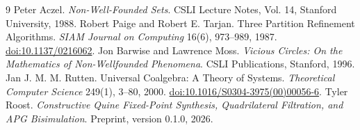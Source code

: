 \documentclass[11pt]{article}
\theoremstyle{definition}
\begin{document}
\begin{thebibliography}{9}
\small
{} Peter Aczel. \emph{Non-Well-Founded Sets}. CSLI Lecture Notes, Vol. 14, Stanford University, 1988.
 Robert Paige and Robert E. Tarjan. Three Partition Refinement Algorithms. \emph{SIAM Journal on Computing} 16(6), 973--989, 1987. \href{https://doi.org/10.1137/0216062}{doi:10.1137/0216062}.
 Jon Barwise and Lawrence Moss. \emph{Vicious Circles: On the Mathematics of Non-Wellfounded Phenomena}. CSLI Publications, Stanford, 1996.
 Jan J. M. M. Rutten. Universal Coalgebra: A Theory of Systems. \emph{Theoretical Computer Science} 249(1), 3--80, 2000. \href{https://doi.org/10.1016/S0304-3975(00)00056-6}{doi:10.1016/S0304-3975(00)00056-6}.
 Tyler Roost. \emph{Constructive Quine Fixed-Point Synthesis, Quadrilateral Filtration, and APG Bisimulation}. Preprint, version 0.1.0, 2026.
\end{thebibliography}
\end{document}
